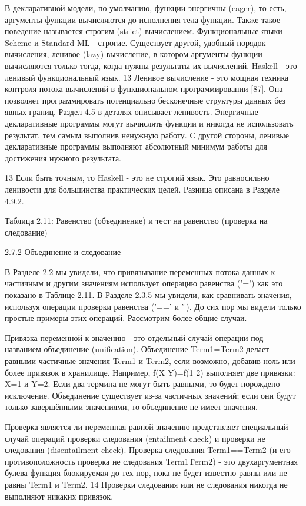 В декларативной модели, по-умолчанию, функции энергичны (eager), то есть, аргументы функции вычисляются до исполнения тела функции. Также такое поведение называется строгим (strict) вычислением. Функциональные языки Scheme и Standard ML - строгие. Существует другой, удобный порядок вычисления, ленивое (lazy) вычисление, в котором аргументы функции вычисляются только тогда, когда нужны результаты их вычислений. Haskell - это ленивый функциональный язык. 13 Ленивое вычисление - это мощная техника контроля потока вычислений в функциональном программировании [87]. Она позволяет программировать потенциально бесконечные структуры данных без явных границ. Раздел 4.5 в деталях описывает ленивость. Энергичные декларативные программы могут вычислять функции и никогда не использовать результат, тем самым выполнив ненужную работу. С другой стороны, ленивые декларативные программы выполняют абсолютный минимум работы для достижения нужного результата.

13 Если быть точным, то Haskell - это не строгий язык. Это равносильно ленивости для большинства практических целей. Разница описана в Разделе 4.9.2.

Таблица 2.11: Равенство (объединение) и тест на равенство (проверка на следование)

2.7.2 Объединение и следование

В Разделе 2.2 мы увидели, что привязывание переменных потока данных к частичным и другим значениям использует операцию равенства ('=') как это показано в Таблице 2.11. В Разделе 2.3.5 мы увидели, как сравнивать значения, используя операции проверки равенства ('==' и '\='). До сих пор мы видели только простые примеры этих операций. Рассмотрим более общие случаи.

Привязка переменной к значению - это отдельный случай операции под названием объединение (unification). Объединение Term1=Term2 делает равными частичные значения Term1 и Term2, если возможно, добавив ноль или более привязок в хранилище. Например, f(X Y)=f(1 2) выполняет две привязки: X=1 и Y=2. Если два термина не могут быть равными, то будет порождено исключение. Объединение существует из-за частичных значений; если они будут только завершёнными значениями, то объединение не имеет значения.

Проверка является ли переменная равной значению представляет специальный случай операций проверки следования (entailment check) и проверки не следования (disentailment check). Проверка следования Term1==Term2 (и его противоположность проверка не следования Term1\=Term2) - это двухаргументная булева функция блокируемая до тех пор, пока не будет известно равны или не равны Term1 и Term2. 14 Проверки следования или не следования никогда не выполняют никаких привязок.

